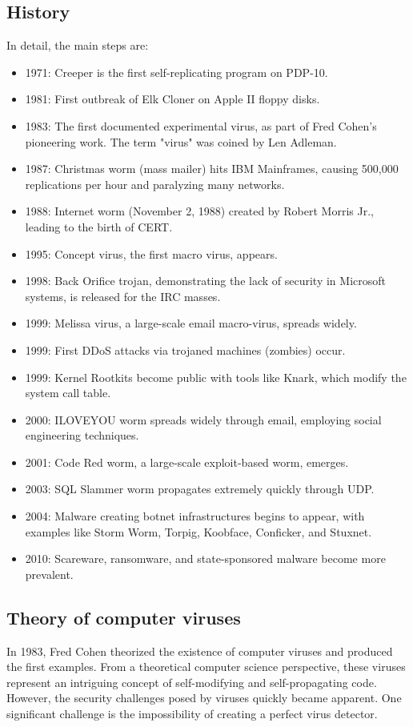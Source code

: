 \subsection{History}
In detail, the main steps are: 
\begin{itemize}
    \item 1971: Creeper is the first self-replicating program on PDP-10.
    \item 1981: First outbreak of Elk Cloner on Apple II floppy disks.
    \item 1983: The first documented experimental virus, as part of Fred Cohen's pioneering work. The term "virus" was coined by Len Adleman.
    \item 1987: Christmas worm (mass mailer) hits IBM Mainframes, causing 500,000 replications per hour and paralyzing many networks.
    \item 1988: Internet worm (November 2, 1988) created by Robert Morris Jr., leading to the birth of CERT.
    \item 1995: Concept virus, the first macro virus, appears.
    \item 1998: Back Orifice trojan, demonstrating the lack of security in Microsoft systems, is released for the IRC masses.
    \item 1999: Melissa virus, a large-scale email macro-virus, spreads widely.
    \item 1999: First DDoS attacks via trojaned machines (zombies) occur.
    \item 1999: Kernel Rootkits become public with tools like Knark, which modify the system call table.
    \item 2000: ILOVEYOU worm spreads widely through email, employing social engineering techniques.
    \item 2001: Code Red worm, a large-scale exploit-based worm, emerges.
    \item 2003: SQL Slammer worm propagates extremely quickly through UDP.
    \item 2004: Malware creating botnet infrastructures begins to appear, with examples like Storm Worm, Torpig, Koobface, Conficker, and Stuxnet.
    \item 2010: Scareware, ransomware, and state-sponsored malware become more prevalent.
\end{itemize}

\subsection{Theory of computer viruses}
In 1983, Fred Cohen theorized the existence of computer viruses and produced the first examples. 
From a theoretical computer science perspective, these viruses represent an intriguing concept of self-modifying and self-propagating code. 
However, the security challenges posed by viruses quickly became apparent.
One significant challenge is the impossibility of creating a perfect virus detector.

